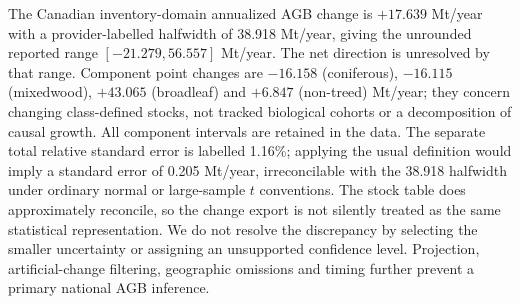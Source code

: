 The Canadian inventory-domain annualized AGB change is $+17.639$ Mt/year with a provider-labelled halfwidth of 38.918 Mt/year, giving the unrounded reported range $[-21.279,56.557]$ Mt/year. The net direction is unresolved by that range. Component point changes are $-16.158$ (coniferous), $-16.115$ (mixedwood), $+43.065$ (broadleaf) and $+6.847$ (non-treed) Mt/year; they concern changing class-defined stocks, not tracked biological cohorts or a decomposition of causal growth. All component intervals are retained in the data. The separate total relative standard error is labelled 1.16\%; applying the usual definition would imply a standard error of 0.205 Mt/year, irreconcilable with the 38.918 halfwidth under ordinary normal or large-sample $t$ conventions. The stock table does approximately reconcile, so the change export is not silently treated as the same statistical representation. We do not resolve the discrepancy by selecting the smaller uncertainty or assigning an unsupported confidence level. Projection, artificial-change filtering, geographic omissions and timing further prevent a primary national AGB inference.
